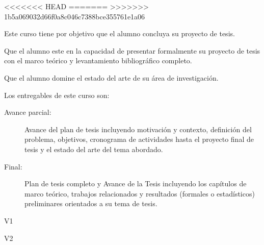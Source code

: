\begin{syllabus}

<<<<<<< HEAD
=======
>>>>>>> 1b5a069032d66f0a8c046c7388bce355761e1a06

\begin{justification}
Este curso tiene por objetivo que el alumno concluya su proyecto de tesis.
\end{justification}

\begin{goals}
\item Que el alumno este en la capacidad de presentar formalmente su proyecto de tesis con el marco teórico y levantamiento bibliográfico completo.
\item Que el alumno domine el estado del arte de su área de investigación.
\item Los entregables de este curso son:
	\begin{description}
	\item [Avance parcial:] Avance del plan de tesis incluyendo motivación y contexto, definición del problema, objetivos, cronograma de actividades hasta el proyecto final de tesis y el estado del arte del tema abordado.
	\item [Final:] Plan de tesis completo y Avance de la Tesis incluyendo los capítulos de marco teórico, trabajos relacionados y resultados (formales o estadísticos) preliminares orientados a su tema de tesis.
	\end{description}
\end{goals}

\begin{outcomes}{V1}
\item {}
\item {}
\item {}
\item {}
\item {}
\item {}
\item {}
\item {}
\end{outcomes}

\begin{outcomes}{V2}
\item {}
\item {}
\item {}
\item {}
\end{outcomes}


\end{syllabus}
